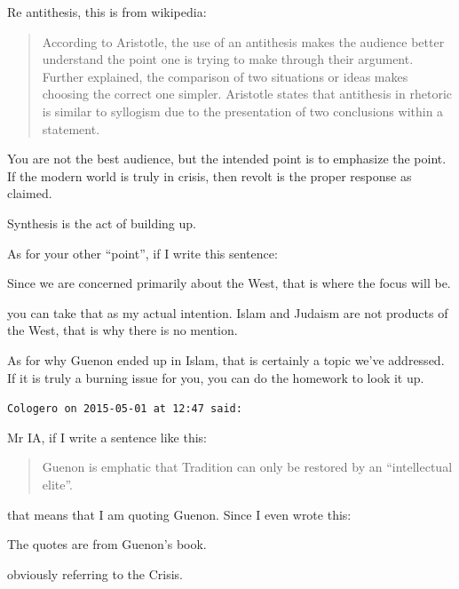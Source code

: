 \begin{footnotesize}
\begin{sffamily}
Re antithesis, this is from wikipedia:

\begin{quote}\footnotesize

According to Aristotle, the use of an antithesis makes the audience better understand the point one is trying to make through their argument. Further explained, the comparison of two situations or ideas makes choosing the correct one simpler. Aristotle states that antithesis in rhetoric is similar to syllogism due to the presentation of two conclusions within a statement.
\end{quote}


You are not the best audience, but the intended point is to emphasize the point. If the modern world is truly in crisis, then revolt is the proper response as claimed.

Synthesis is the act of building up.

As for your other ``point'', if I write this sentence:

\begin{quotex}\footnotesize

Since we are concerned primarily about the West, that is where the focus will be.
\end{quotex}


you can take that as my actual intention. Islam and Judaism are not products of the West, that is why there is no mention.

As for why Guenon ended up in Islam, that is certainly a topic we've addressed. If it is truly a burning issue for you, you can do the homework to look it up.

\hfill

\texttt{Cologero on 2015-05-01 at 12:47 said:}

Mr IA, if I write a sentence like this:

\begin{quote}\footnotesize

Guenon is emphatic that Tradition can only be restored by an ``intellectual elite''.
\end{quote}


that means that I am quoting Guenon. Since I even wrote this:

\begin{quotex}\footnotesize

The quotes are from Guenon's book.
\end{quotex}


obviously referring to the Crisis.


\end{sffamily}
\end{footnotesize}

